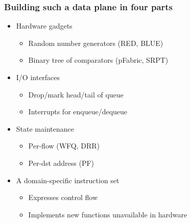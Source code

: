 \begin{frame}[plain]
\frametitle{Building such a data plane in four parts}
\begin{itemize}
\item Hardware gadgets
      \begin{itemize}
      \item Random number generators (RED, BLUE)
      \item Binary tree of comparators (pFabric, SRPT)
      \end{itemize}

\item I/O interfaces
      \begin{itemize}
      \item Drop/mark head/tail of queue
      \item Interrupts for enqueue/dequeue
      \end{itemize}

\item State maintenance
      \begin{itemize}
      \item Per-flow (WFQ, DRR)
      \item Per-dst address (PF)
      \end{itemize}

\item A domain-specific instruction set
      \begin{itemize}
      \item Expresses control flow
      \item Implements new functions unavailable in hardware
      \end{itemize}
\end{itemize}
\end{frame}

